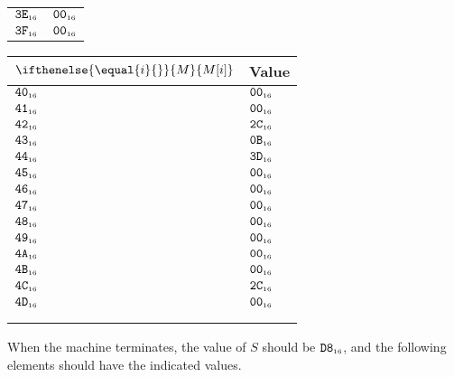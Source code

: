 \documentclass[a4paper,12pt]{article}
\newcommand{\num}[1]{\texttt{#1}}
\newcommand{\hex}[1]{\num{#1}_{\textup{\tiny 16}}}
\newcommand{\MEM}[1]{\ifthenelse{\equal{#1}{}}{M}{M[#1]}}
\newcommand{\SP}{S}
\begin{document}
\begin{center}
\begin{tabular}{@{}ll@{}}
    $\hex{3E}$ & $\hex{00}$ \\
    $\hex{3F}$ & $\hex{00}$ \\
    \hline
  \end{tabular}
  \hfil
  \begin{tabular}{@{}ll@{}}
    \hline
    $\MEM{i}$  & Value \\
    \hline
    $\hex{40}$ & $\hex{00}$ \\
    $\hex{41}$ & $\hex{00}$ \\
    $\hex{42}$ & $\hex{2C}$ \\
    $\hex{43}$ & $\hex{0B}$ \\
    $\hex{44}$ & $\hex{3D}$ \\
    $\hex{45}$ & $\hex{00}$ \\
    $\hex{46}$ & $\hex{00}$ \\
    $\hex{47}$ & $\hex{00}$ \\
    $\hex{48}$ & $\hex{00}$ \\
    $\hex{49}$ & $\hex{00}$ \\
    $\hex{4A}$ & $\hex{00}$ \\
    $\hex{4B}$ & $\hex{00}$ \\
    $\hex{4C}$ & $\hex{2C}$ \\
    $\hex{4D}$ & $\hex{00}$ \\
    \\
    \\
    \hline
  \end{tabular}
\end{center}

When the machine terminates, the value of $\SP$ should be $\hex{D8}$, and the following elements should have the indicated values.
\end{document}
